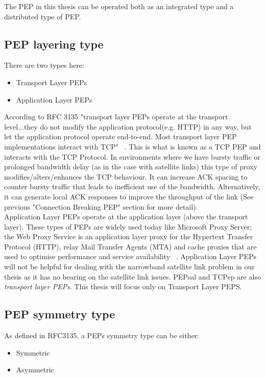 The PEP in this thesis can be operated both as an integrated type and a distributed type of PEP. 
 
\subsection{PEP layering type}
There are two types here: \\
\begin{itemize}
\item Transport Layer PEPs
\item Application Layer PEPs\\
\end{itemize}

According to RFC 3135 "transport layer PEPs operate at the transport level...they do not modify the application protocol(e.g. HTTP) in any way, but let the application protocol operate end-to-end.  Most transport layer PEP implementations interact with TCP" ~\cite{6}. This is what is known as a TCP PEP and interacts with the TCP Protocol. In environments where we have bursty traffic or prolonged bandwidth delay (as in the case with satellite links) this type of proxy modifies/alters/enhances the TCP behaviour. It can increase ACK spacing to counter bursty traffic that leads to inefficient use of the bandwidth. Alternatively, it can generate local ACK responses to improve the throughput of the link (See previous "Connection Breaking PEP" section for more detail).\\

Application Layer PEPs operate at the application layer (above the transport layer). These types of PEPs are widely used today like Microsoft Proxy Server; the Web Proxy Service is an application layer proxy for the Hypertext Transfer Protocol (HTTP), relay Mail Transfer Agents (MTA) and cache proxies that are used to optimise performance and service availability ~\cite{6}. Application Layer PEPs will not be helpful for dealing with the narrowband satellite link problem in our thesis as it has no bearing on the satellite link issues. PEPsal and TCPep are also \emph{transport layer PEPs}. This thesis will focus only on Transport Layer PEPS.

\subsection{PEP symmetry type}
As defined in RFC3135, a PEPs symmetry type can be either:

\begin{itemize}
\item Symmetric
\item Asymmetric
\end{itemize}

